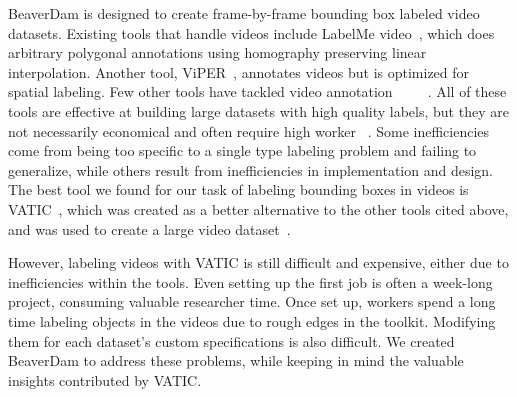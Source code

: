 BeaverDam is designed to create frame-by-frame bounding box labeled video datasets.
Existing tools that handle videos include LabelMe video~\cite{LabelMeVideo}, which does arbitrary polygonal annotations using homography preserving linear interpolation.
Another tool, ViPER~\cite{ViPER}, annotates videos but is optimized for spatial labeling.
Few other tools have tackled video annotation~\cite{FlowBoost}~\cite{Agarwala}~\cite{Fisher}~\cite{Smeaton}~\cite{Laptev}.
All of these tools are effective at building large datasets with high quality labels, but they are not necessarily economical and often require high worker ~\cite{AnnotationCost}.
Some inefficiencies come from being too specific to a single type labeling problem and failing to generalize, while others result from inefficiencies in implementation and design.
The best tool we found for our task of labeling bounding boxes in videos is VATIC~\cite{Vatic}, which was created as a better alternative to the other tools cited above, and was used to create a large video dataset~\cite{virat}.

However, labeling videos with VATIC is still difficult and expensive, either due to inefficiencies within the tools.
Even setting up the first job is often a week-long project, consuming valuable researcher time.
Once set up, workers spend a long time labeling objects in the videos due to rough edges in the toolkit.
Modifying them for each dataset's custom specifications is also difficult.
We created BeaverDam to address these problems, while keeping in mind the valuable insights contributed by VATIC.
